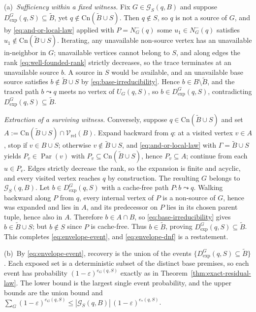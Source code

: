 \documentclass[journal]{IEEEtran}
\makeatletter
\newcommand{\Cn}{\text{Cn}}
\numberwithin{equation}{section}
\renewenvironment{proof}[1][\proofname]{\par
  \pushQED{\qed}%
  \normalfont \topsep6\p@\@plus6\p@\relax
  \trivlist
  \item[\hskip\labelsep
        \itshape
    #1\@addpunct{.}]\ignorespaces
}{%
  \popQED\endtrivlist\@endpefalse
}
\makeatother
\begin{document}
\begin{proof}
(a)\ \emph{Sufficiency within a fixed witness.}
Fix \(G\in\mathcal G_S(q,B)\) and suppose
\(D_{\mathrm{exp}}^{G}(q,S)\subseteq\widetilde B\), yet
\(q\notin\Cn(\widetilde B\cup S)\).  Then \(q\notin S\), so \(q\) is not a
source of \(G\), and by \eqref{eq:and-or-local-law} applied with
\(P=N_G^{-}(q)\) some \(u_1\in N_G^{-}(q)\) satisfies
\(u_1\notin\Cn(\widetilde B\cup S)\).  Iterating, any unavailable non-source
vertex has an unavailable in-neighbor in \(G\); unavailable vertices cannot
belong to \(S\), and along edges the rank \eqref{eq:well-founded-rank}
strictly decreases, so the trace terminates at an unavailable source
\(b\).  A source in \(S\) would be available, and an unavailable base source
satisfies \(b\notin\widetilde B\cup S\) by \eqref{eq:base-irreducibility}.
Hence \(b\in B\setminus\widetilde B\), and the traced path
\(b\leadsto q\) meets no vertex of \(U_G(q,S)\), so
\(b\in D_{\mathrm{exp}}^{G}(q,S)\), contradicting
\(D_{\mathrm{exp}}^{G}(q,S)\subseteq\widetilde B\).

\emph{Extraction of a surviving witness.}
Conversely, suppose \(q\in\Cn(\widetilde B\cup S)\) and set
\(A:=\Cn(\widetilde B\cup S)\cap\mathcal V_{\mathrm{rel}}(B)\).  Expand
backward from \(q\): at a visited vertex \(v\in A\), stop if
\(v\in B\cup S\); otherwise \(v\notin\widetilde B\cup S\), and
\eqref{eq:and-or-local-law} with \(\Gamma=\widetilde B\cup S\) yields
\(P_v\in\operatorname{Par}(v)\) with \(P_v\subseteq\Cn(\widetilde B\cup S)\),
hence \(P_v\subseteq A\); continue from each \(u\in P_v\).  Edges strictly
decrease the rank, so the expansion is finite and acyclic, and every visited
vertex reaches \(q\) by construction.  The resulting \(G\) belongs to
\(\mathcal G_S(q,B)\).  Let \(b\in D_{\mathrm{exp}}^{G}(q,S)\) with a
cache-free path \(P:b\leadsto q\).  Walking backward along \(P\) from \(q\),
every internal vertex of \(P\) is a non-source of \(G\), hence was expanded
and lies in \(A\), and its predecessor on \(P\) lies in its chosen parent
tuple, hence also in \(A\).  Therefore \(b\in A\cap B\), so
\eqref{eq:base-irreducibility} gives \(b\in\widetilde B\cup S\); but
\(b\notin S\) since \(P\) is cache-free.  Thus
\(b\in\widetilde B\), proving
\(D_{\mathrm{exp}}^{G}(q,S)\subseteq\widetilde B\).  This completes
\eqref{eq:envelope-event}, and \eqref{eq:envelope-dnf} is a restatement.

(b)\ By \eqref{eq:envelope-event}, recovery is the union of the events
\(\{D_{\mathrm{exp}}^{G}(q,S)\subseteq\widetilde B\}\).  Each exposed set is
a deterministic subset of the distinct base premises, so each event has
probability \((1-\varepsilon)^{e_G(q,S)}\) exactly as in
Theorem~\ref{thm:exact-residual-law}.  The lower bound is the largest single
event probability, and the upper bounds are the union bound and
\(\sum_G(1-\varepsilon)^{e_G(q,S)}\le|\mathcal G_S(q,B)|\,
(1-\varepsilon)^{e_*(q,S)}\).


\end{proof}
\end{document}
